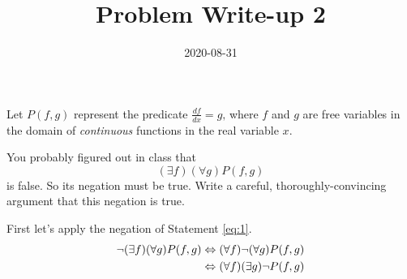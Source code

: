 \documentclass[12pt,a4paper]{article}
\title{Problem Write-up 2}
\date{2020-08-31}
\begin{document}
    \begin{problem}
        Let \(P(f,g)\) represent the predicate \(\frac{df}{dx} = g\text{,}\) where \(f\) and \(g\) are free variables in the domain of \emph{continuous} functions in the real variable \(x\).

        You probably figured out in class that 
        \begin{equation} \label{eq:1}
        	(\exists f)(\forall g) P(f,g)
        \end{equation}
         is false. So its negation must be true. Write a careful, thoroughly-convincing argument that this negation is true.
    \end{problem}
    
    \begin{answer}
        First let's apply the negation of Statement \ref{eq:1}.
        \begin{align*}
        	\neg (\exists f)(\forall g) P(f,g) &\Leftrightarrow (\forall f) \neg (\forall g) P(f,g) \\
        	&\Leftrightarrow (\forall  f) (\exists g) \neg P(f,g)
        \end{align*}
    \end{answer}
\end{document}

